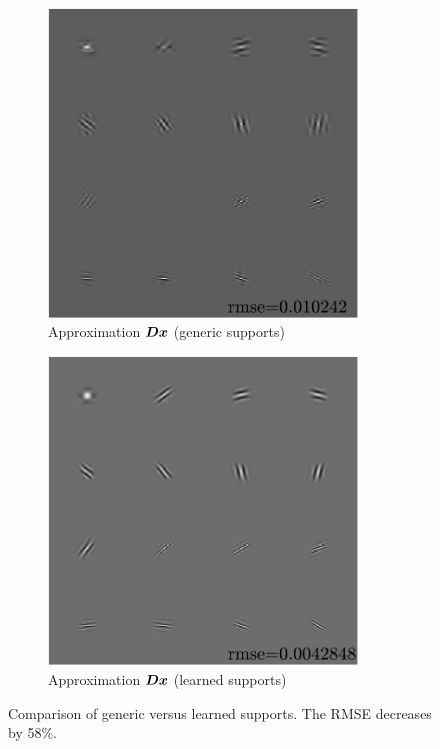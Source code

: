 \begin{figure} \ContinuedFloat
\begin{subfigure}[b]{0.49\textwidth}\centering
\includegraphics[width=0.9\textwidth]{figures/tree-learn/xp_learnsupp256_curvelet_decomp3[tree-binary_dpth4]_supp-generic3x3_[fixed-supports]_approx.pdf}
	\caption{Approximation $\bm{D}\bm{x}$ (generic supports)}
\end{subfigure}
\begin{subfigure}[b]{0.49\textwidth}\centering
\includegraphics[width=0.9\textwidth]{figures/tree-learn/gradient-vs-sequential/xp_learnsupp256_curvelet_decomp3_tree-binary_dpth4_supp-diracs_usegrad1_every5_add5_totinit0_totadd279_alpha30_approx.pdf} 
	\caption{Approximation $\bm{D}\bm{x}$ (learned supports)}
\end{subfigure}
\caption{Comparison of generic versus learned supports. The RMSE decreases by 58\%.}\label{fig_learnsupp_vs_generic}
\end{figure}

